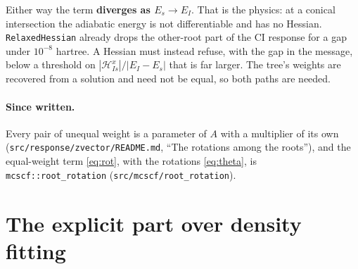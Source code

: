 \documentclass[11pt]{article}
\newcommand{\code}[1]{\texttt{#1}}
\begin{document}
Either way the term \textbf{diverges as $E_s \to E_I$}. That is the
physics: at a conical intersection the adiabatic energy is not
differentiable and has no Hessian. \code{RelaxedHessian} already drops the
other-root part of the CI response for a gap under $10^{-8}$ hartree. A
Hessian must instead refuse, with the gap in the message, below a threshold
on $|\mathcal H^x_{Is}|/|E_I - E_s|$ that is far larger. The tree's weights
are recovered from a solution and need not be equal, so both paths are
needed.

\paragraph{Since written.} Every pair of unequal weight is a parameter of
$A$ with a multiplier of its own (\code{src/response/zvector/README.md},
``The rotations among the roots''), and the equal-weight term
\eqref{eq:rot}, with the rotations \eqref{eq:theta}, is
\code{mcscf::root\_rotation} (\code{src/mcscf/root\_rotation}).

\section{The explicit part over density fitting}
\label{sec:df}
\end{document}
